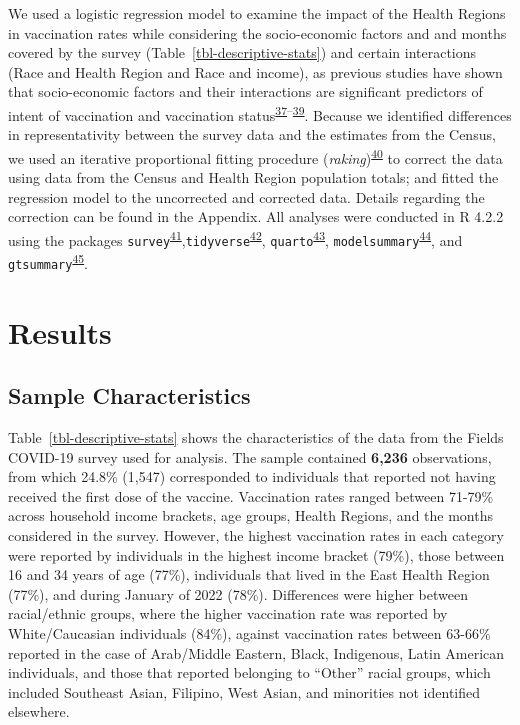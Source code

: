 \documentclass[
  letterpaper,
  DIV=11,
  numbers=noendperiod]{scrartcl}
\begin{document}
We used a logistic regression model to examine the impact of the Health
Regions in vaccination rates while considering the socio-economic
factors and and months covered by the survey
(Table~\ref{tbl-descriptive-stats}) and certain interactions (Race and
Health Region and Race and income), as previous studies have shown that
socio-economic factors and their interactions are significant predictors
of intent of vaccination and vaccination
status\textsuperscript{\protect\hyperlink{ref-nguyen2022}{37}--\protect\hyperlink{ref-cnat2022a}{39}}.
Because we identified differences in representativity between the survey
data and the estimates from the Census, we used an iterative
proportional fitting procedure
(\emph{raking})\textsuperscript{\protect\hyperlink{ref-deming1940}{40}}
to correct the data using data from the Census and Health Region
population totals; and fitted the regression model to the uncorrected
and corrected data. Details regarding the correction can be found in the
Appendix. All analyses were conducted in R 4.2.2 using the packages
\texttt{survey}\textsuperscript{\protect\hyperlink{ref-lumley2011}{41}},\texttt{tidyverse}\textsuperscript{\protect\hyperlink{ref-wickham2019}{42}},
\texttt{quarto}\textsuperscript{\protect\hyperlink{ref-quarto}{43}},
\texttt{modelsummary}\textsuperscript{\protect\hyperlink{ref-modelsummary}{44}},
and
\texttt{gtsummary}\textsuperscript{\protect\hyperlink{ref-gtsummary}{45}}.

\hypertarget{results}{%
\section{Results}\label{results}}

\hypertarget{sample-characteristics}{%
\subsection{Sample Characteristics}\label{sample-characteristics}}

Table~\ref{tbl-descriptive-stats} shows the characteristics of the data
from the Fields COVID-19 survey used for analysis. The sample contained
\textbf{6,236} observations, from which 24.8\% (1,547) corresponded to
individuals that reported not having received the first dose of the
vaccine. Vaccination rates ranged between 71-79\% across household
income brackets, age groups, Health Regions, and the months considered
in the survey. However, the highest vaccination rates in each category
were reported by individuals in the highest income bracket (79\%), those
between 16 and 34 years of age (77\%), individuals that lived in the
East Health Region (77\%), and during January of 2022 (78\%).
Differences were higher between racial/ethnic groups, where the higher
vaccination rate was reported by White/Caucasian individuals (84\%),
against vaccination rates between 63-66\% reported in the case of
Arab/Middle Eastern, Black, Indigenous, Latin American individuals, and
those that reported belonging to ``Other'' racial groups, which included
Southeast Asian, Filipino, West Asian, and minorities not identified
elsewhere.
\end{document}
